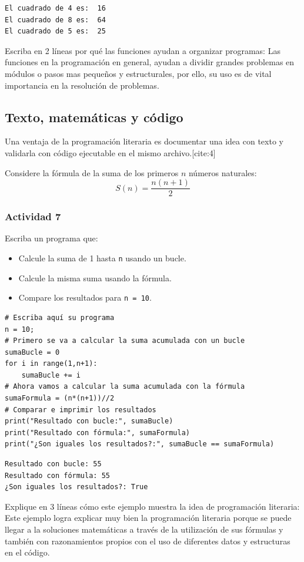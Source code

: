 \documentclass{article}
\begin{document}
\begin{verbatim}
El cuadrado de 4 es:  16
El cuadrado de 8 es:  64
El cuadrado de 5 es:  25
\end{verbatim}


Escriba en 2 líneas por qué las funciones ayudan a organizar
programas:
Las funciones en la programación en general, ayudan a dividir grandes
problemas en módulos o pasos mas pequeños y estructurales, por ello,
su uso es de vital importancia en la resolución de problemas.

\subsection{Texto, matemáticas y código}
\label{sec:org5d2a988}
Una ventaja de la programación literaria es documentar una idea con texto y validarla con código ejecutable en el mismo archivo.[cite:4]

Considere la fórmula de la suma de los primeros \(n\) números naturales:
\[
S(n) = \frac{n(n+1)}{2}
\]

\subsubsection{Actividad 7}
\label{sec:org14b3cc3}
Escriba un programa que:
\begin{itemize}
\item Calcule la suma de 1 hasta \texttt{n} usando un bucle.
\item Calcule la misma suma usando la fórmula.
\item Compare los resultados para \texttt{n = 10}.
\end{itemize}

\begin{verbatim}
# Escriba aquí su programa
n = 10;
# Primero se va a calcular la suma acumulada con un bucle
sumaBucle = 0
for i in range(1,n+1):
    sumaBucle += i
# Ahora vamos a calcular la suma acumulada con la fórmula
sumaFormula = (n*(n+1))//2
# Comparar e imprimir los resultados
print("Resultado con bucle:", sumaBucle)
print("Resultado con fórmula:", sumaFormula)
print("¿Son iguales los resultados?:", sumaBucle == sumaFormula)
\end{verbatim}

\begin{verbatim}
Resultado con bucle: 55
Resultado con fórmula: 55
¿Son iguales los resultados?: True
\end{verbatim}


Explique en 3 líneas cómo este ejemplo muestra la idea de programación
literaria:
Este ejemplo logra explicar muy bien la programación literaria porque
se puede llegar a la soluciones matemáticas a través de la utilización
de sus fórmulas y también con razonamientos propios con el uso de
diferentes datos y estructuras en el código. 
\end{document}
